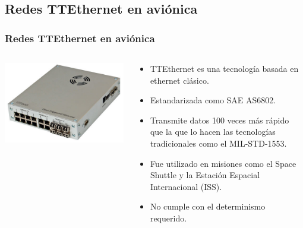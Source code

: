 \subsection{Redes TTEthernet en aviónica}
\begin{frame}
	\frametitle{Redes TTEthernet en aviónica}
	\begin{columns}[T]
		\begin{column}{.5\textwidth}
			\includegraphics[scale=0.4]{images/ttethernet.png}
		\end{column}
		\begin{column}{.5\textwidth}
			\begin{itemize}
				\item TTEthernet es una tecnología basada en ethernet clásico. 
				\item Estandarizada como SAE AS6802.
				\item Transmite datos 100 veces más rápido que la que lo hacen las tecnologías tradicionales como el MIL-STD-1553.
				\item Fue utilizado en misiones como el Space Shuttle y la Estación Espacial Internacional (ISS).
				\item No cumple con el determinismo  requerido. 
			\end{itemize}
		\end{column}
	\end{columns}
\end{frame}